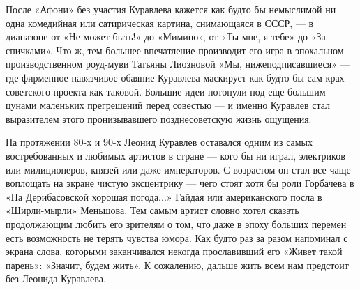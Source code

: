 После «Афони» без участия Куравлева кажется как будто бы немыслимой ни одна
комедийная или сатирическая картина, снимающаяся в СССР, — в диапазоне от «Не
может быть!» до «Мимино», от «Ты мне, я тебе» до «За спичками». Что ж, тем
большее впечатление производит его игра в эпохальном производственном роуд-муви
Татьяны Лиозновой «Мы, нижеподписавшиеся» — где фирменное навязчивое обаяние
Куравлева маскирует как будто бы сам крах советского проекта как таковой.
Большие идеи потонули под еще большим цунами маленьких прегрешений перед
совестью — и именно Куравлев стал выразителем этого пронизывавшего
позднесоветскую жизнь ощущения.


На протяжении 80-х и 90-х Леонид Куравлев оставался одним из самых
востребованных и любимых артистов в стране — кого бы ни играл, электриков или
милиционеров, князей или даже императоров. С возрастом он стал все чаще
воплощать на экране чистую эксцентрику — чего стоят хотя бы роли Горбачева в
«На Дерибасовской хорошая погода...» Гайдая или американского посла в
«Ширли-мырли» Меньшова. Тем самым артист словно хотел сказать продолжающим
любить его зрителям о том, что даже в эпоху больших перемен есть возможность не
терять чувства юмора. Как будто раз за разом напоминал с экрана слова, которыми
заканчивался некогда прославивший его «Живет такой парень»: «Значит, будем
жить». К сожалению, дальше жить всем нам предстоит без Леонида Куравлева.
